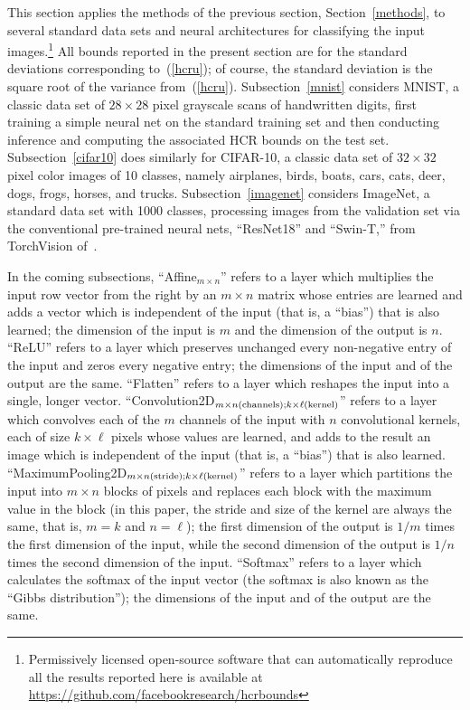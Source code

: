 \documentclass[]{fairmeta}
\begin{document}
This section applies the methods of the previous section,
Section~\ref{methods}, to several standard data sets and neural architectures
for classifying the input images.\footnote{Permissively licensed open-source
software that can automatically reproduce all the results reported here
is available at \url{https://github.com/facebookresearch/hcrbounds}}
All bounds reported in the present section are for the standard deviations
corresponding to~(\ref{hcru}); of course, the standard deviation
is the square root of the variance from~(\ref{hcru}).
Subsection~\ref{mnist} considers MNIST,
a classic data set of $28 \times 28$ pixel grayscale scans
of handwritten digits, first training a simple neural net
on the standard training set and then conducting inference
and computing the associated HCR bounds on the test set.
Subsection~\ref{cifar10} does similarly for CIFAR-10, a classic data set
of $32 \times 32$ pixel color images of 10 classes, namely
airplanes, birds, boats, cars, cats, deer, dogs, frogs, horses, and trucks.
Subsection~\ref{imagenet} considers ImageNet, a standard data set
with 1000 classes, processing images from the validation set
via the conventional pre-trained neural nets, ``ResNet18'' and ``Swin-T,''
from TorchVision of~\cite{torchvision}.

In the coming subsections, ``Affine$_{m \times n}$'' refers to a layer
which multiplies the input row vector from the right
by an $m \times n$ matrix whose entries are learned and adds a vector which is
independent of the input (that is, a ``bias'') that is also learned;
the dimension of the input is $m$ and the dimension of the output is $n$.
``ReLU'' refers to a layer which preserves unchanged every non-negative entry
of the input and zeros every negative entry; the dimensions of the input
and of the output are the same.
``Flatten'' refers to a layer which reshapes the input into a single,
longer vector.
``Convolution2D$_{m \times n{\rm (channels)}; k \times \ell{\rm (kernel)}}$''
refers to a layer which convolves each of the $m$ channels of the input
with $n$ convolutional kernels, each of size $k \times \ell$ pixels
whose values are learned, and adds to the result an image which is
independent of the input (that is, a ``bias'') that is also learned.
``MaximumPooling2D$_{m \times n{\rm (stride)}; k \times \ell{\rm (kernel)}}$''
refers to a layer which partitions the input into $m \times n$ blocks of pixels
and replaces each block with the maximum value in the block
(in this paper, the stride and size of the kernel are always the same,
that is, $m = k$ and $n = \ell$);
the first dimension of the output is $1/m$ times the first dimension
of the input, while the second dimension of the output is $1/n$ times
the second dimension of the input.
``Softmax'' refers to a layer which calculates the softmax of the input vector
(the softmax is also known as the ``Gibbs distribution'');
the dimensions of the input and of the output are the same.
\end{document}
